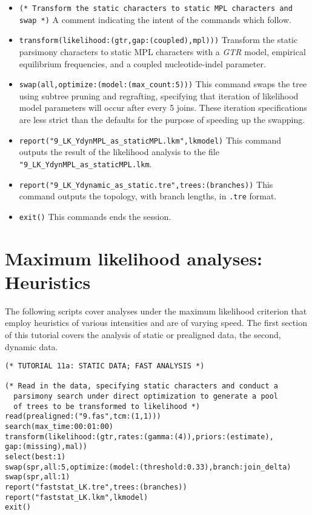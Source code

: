 \begin{itemize}
\item \texttt{(* Transform the static characters to static MPL characters and swap *)} A comment indicating the 
intent of the commands which follow.
\item \texttt{transform(likelihood:(gtr,gap:(coupled),mpl)))} Transform the static parsimony characters to static 
MPL characters with a \emph{GTR} model, empirical equilibrium frequencies, and a coupled nucleotide-indel 
parameter.
\item \texttt{swap(all,optimize:(model:(max\_count:5)))} This command swaps the tree using subtree pruning and 
regrafting, specifying that iteration of likelihood model parameters will occur after every 5 joins. These iteration 
specifications are less strict than the defaults for the purpose of speeding up the swapping.
\item \texttt{report("9\_LK\_YdynMPL\_as\_staticMPL.lkm",lkmodel)} This command outputs the result of 
the likelihood analysis to the file \texttt{"9\_LK\_YdynMPL\_as\_staticMPL.lkm}.
\item \texttt{report("9\_LK\_Ydynamic\_as\_static.tre",trees:(branches))} This command outputs the topology, 
with branch lengths, in \texttt{.tre} format.
\item \texttt{exit()} This commands ends the \poy session.
\end{itemize}


\section{Maximum likelihood analyses: Heuristics}{\label{tutorial11}}
The following scripts cover analyses under the maximum likelihood criterion that employ heuristics of various intensities
and are of varying speed. The first section of this tutorial covers the analysis of static or prealigned data, the second, 
dynamic data. %
\begin{verbatim}
(* TUTORIAL 11a: STATIC DATA; FAST ANALYSIS *) 

(* Read in the data, specifying static characters and conduct a 
  parsimony search under direct optimization to generate a pool 
  of trees to be transformed to likelihood *)
read(prealigned:("9.fas",tcm:(1,1)))
search(max_time:00:01:00)
transform(likelihood:(gtr,rates:(gamma:(4)),priors:(estimate),
gap:(missing),mal))
select(best:1)
swap(spr,all:5,optimize:(model:(threshold:0.33),branch:join_delta)
swap(spr,all:1)
report("faststat_LK.tre",trees:(branches))
report("faststat_LK.lkm",lkmodel)
exit()
\end{verbatim}

